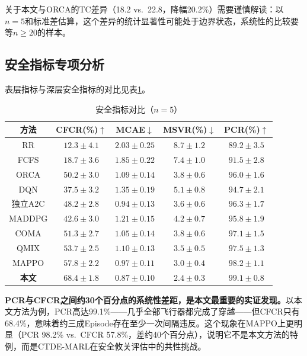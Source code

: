 \documentclass[12pt,a4paper,UTF8]{ctexart}
\begin{document}
关于本文与ORCA的TC差异（18.2 vs.\ 22.8，降幅20.2\%）需要谨慎解读：以$n=5$和标准差估算，这个差异的统计显著性可能处于边界状态，系统性的比较要等$n\geq20$的样本。

\subsection{安全指标专项分析}

表层指标与深层安全指标的对比见表\ref{tab:safety}。

\begin{table}[H]
    \centering
    \caption{安全指标对比（$n=5$）}
    \label{tab:safety}
    \begin{tabular}{|c|c|c|c|c|}
        \hline
        \textbf{方法} & \textbf{CFCR(\%)$\uparrow$} & \textbf{MCAE$\downarrow$} & \textbf{MSVR(\%)$\downarrow$} & \textbf{PCR(\%)$\uparrow$} \\
        \hline
        RR & $12.3\pm4.1$ & $2.03\pm0.25$ & $8.7\pm1.2$ & $89.2\pm3.5$ \\
        FCFS & $18.7\pm3.6$ & $1.85\pm0.22$ & $7.4\pm1.0$ & $91.5\pm2.8$ \\
        ORCA & $50.2\pm3.0$ & $1.09\pm0.14$ & $3.8\pm0.6$ & $96.0\pm1.6$ \\
        DQN & $37.5\pm3.2$ & $1.35\pm0.19$ & $5.1\pm0.8$ & $94.7\pm2.1$ \\
        独立A2C & $48.2\pm2.8$ & $0.94\pm0.13$ & $3.6\pm0.6$ & $96.3\pm1.7$ \\
        MADDPG & $42.6\pm3.0$ & $1.21\pm0.15$ & $4.2\pm0.7$ & $95.8\pm1.9$ \\
        COMA & $51.3\pm2.7$ & $1.05\pm0.14$ & $3.8\pm0.6$ & $97.1\pm1.5$ \\
        QMIX & $53.7\pm2.5$ & $1.10\pm0.13$ & $3.5\pm0.5$ & $97.5\pm1.3$ \\
        MAPPO & $57.8\pm2.2$ & $0.97\pm0.11$ & $3.0\pm0.4$ & $98.2\pm1.1$ \\
        \textbf{本文} & $\mathbf{68.4\pm1.8}$ & $\mathbf{0.87\pm0.10}$ & $\mathbf{2.4\pm0.3}$ & $\mathbf{99.1\pm0.8}$ \\
        \hline
    \end{tabular}
\end{table}

\textbf{PCR与CFCR之间约30个百分点的系统性差距，是本文最重要的实证发现。}以本文方法为例，PCR高达99.1\%——几乎全部飞行器都完成了穿越——但CFCR只有68.4\%，意味着约三成Episode存在至少一次间隔违反。这个现象在MAPPO上更明显（PCR 98.2\% vs.\ CFCR 57.8\%，差约40个百分点），说明它不是本文方法的特例，而是CTDE-MARL在安全攸关评估中的共性挑战。
\end{document}
